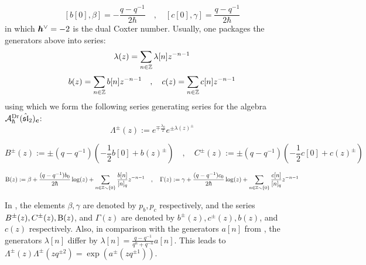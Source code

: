                 \begin{equation} \label{equation: q_deformed_affine_sl_2_oscillator_beta_gamma_commutators}
                    [ b[0], \beta ] = -\frac{q - q^{-1}}{2\hbar} \quad, \quad [ c[0], \gamma ] = \frac{q - q^{-1}}{2\hbar}
                \end{equation}
            in which $\boldsymbol{h}^{\vee} = -2$ is the dual Coxter number. Usually, one packages the generators above into series:
                $$\lambda(z) = \sum_{n \in \mathbb{Z}} \lambda[n] z^{-n - 1}$$
                $$
                    b(z) = \sum_{n \in \mathbb{Z}} b[n] z^{-n - 1} \quad, \quad c(z) = \sum_{n \in \mathbb{Z}} c[n] z^{-n - 1}
                $$
            using which we form the following series generating series for the algebra $\mathcal{A}_{\hbar}^{\mathrm{Dr}}(\hat{\mathfrak{sl}}_2)_{\boldsymbol{c}}$:
                \begin{equation} \label{equation: q_deformed_affine_sl_2_oscillator_Lambda_generating_series}
                    \Lambda^{\pm}(z) := e^{ \mp \frac{\lambda_0}{2} } e^{ \pm \lambda(z)^{\pm} }
                \end{equation}
                
                \begin{equation} \label{equation: q_deformed_affine_sl_2_oscillator_BC_generating_series}
                    B^{\pm}(z) := \pm (q - q^{-1}) \left( -\frac12 b[0] + b(z)^{\pm} \right)
                    \quad, \quad
                    C^{\pm}(z) := \pm (q - q^{-1}) \left( -\frac12 c[0] + c(z)^{\pm} \right)
                \end{equation}
                
                \begin{equation} \label{equation: quatum_affine_sl_2_oscillator_Theta_Gamma_generating_series}
                    \mathrm{B}(z) := \beta + \frac{(q - q^{-1}) b_0}{2\hbar} \log(z) + \sum_{n \in \mathbb{Z} \smallsetminus \{0\}} \frac{b[n]}{[n]_q} z^{-n - 1}
                    \quad, \quad
                    \Gamma(z) := \gamma + \frac{(q - q^{-1}) c_0}{2\hbar} \log(z) + \sum_{n \in \mathbb{Z} \smallsetminus \{0\}} \frac{c[n]}{[n]_q} z^{-n - 1}
                \end{equation}
            \begin{remark}
                In \cite{frenkel_reshetikhin_affine_QUEs_and_deformed_virasoro_and_finite_W_algebras}, the elements $\beta, \gamma$ are denoted by $p_b, p_c$ respectively, and the series $B^{\pm}(z), C^{\pm}(z), \mathrm{B}(z)$, and $\Gamma(z)$ are denoted by $b^{\pm}(z), c^{\pm}(z), b(z)$, and $c(z)$ respectively. Also, in comparison with the generators $a[n]$ from \cite{awata_odake_shiraishi_free_boson_realisation_of_quantum_affine_sl_N}, the generators $\lambda[n]$ differ by $\lambda[n] = \frac{q - q^{-1}}{q^n + q^{-n}} a[n]$. This leads to $\Lambda^{\pm}(z) \Lambda^{\pm}(z q^{\pm 2}) = \exp\left( a^{\pm}( z q^{\pm 1} ) \right)$. 
            \end{remark}
            
